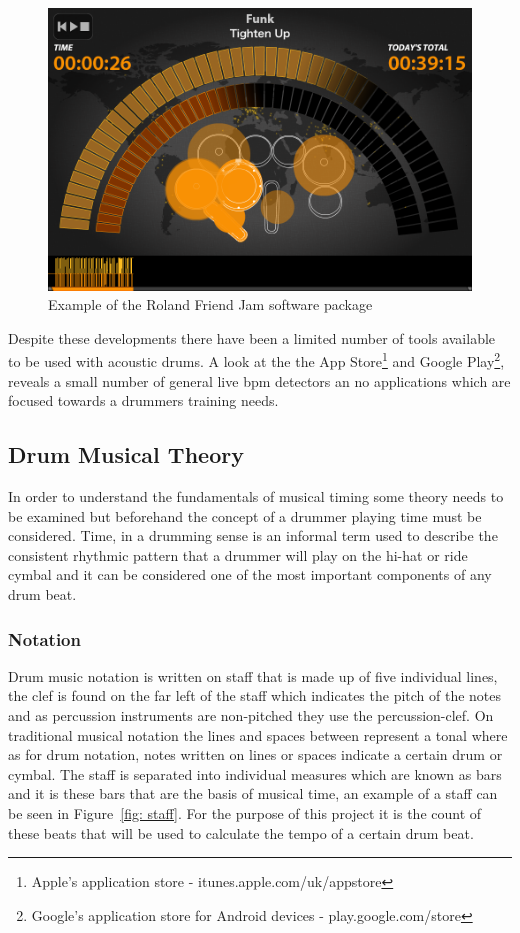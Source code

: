 \documentclass[a4paper, 11pt]{article}
\begin{document}
\begin{figure}[htbp]
\centering
\includegraphics[scale=0.175]{images/friendjam.png}
\caption{Example of the Roland Friend Jam software package}
\label{fig: friendjam}
\end{figure}

Despite these developments there have been a limited number of tools available to be used with acoustic drums. A look at the the App Store\footnote{Apple's application store - itunes.apple.com/uk/appstore‎} and Google Play\footnote{Google's application store for Android devices - play.google.com/store}, reveals a small number of general live bpm detectors an no applications which are focused towards a drummers training needs.\par

\subsection{Drum Musical Theory}
In order to understand the fundamentals of musical timing some theory needs to be examined but beforehand the concept of a drummer playing time must be considered. Time, in a drumming sense is an informal term used to describe the consistent rhythmic pattern that a drummer will play on the hi-hat or ride cymbal \cite{drum-bible} and it can be considered one of the most important components of any drum beat. 

\subsubsection{Notation}
Drum music notation is written on staff that is made up of five individual lines, the clef is found on the far left of the staff which indicates the pitch of the notes \cite{oxford-comp} and as percussion instruments are non-pitched they use the percussion-clef. On traditional musical notation the lines and spaces between represent a tonal where as for drum notation, notes written on lines or spaces indicate a certain drum or cymbal. The staff is separated into individual measures which are known as bars \cite{drum-note} and it is these bars that are the basis of musical time, an example of a staff can be seen in Figure~\ref{fig: staff}. For the purpose of this project it is the count of these beats that will be used to calculate the tempo of a certain drum beat.
\end{document}
